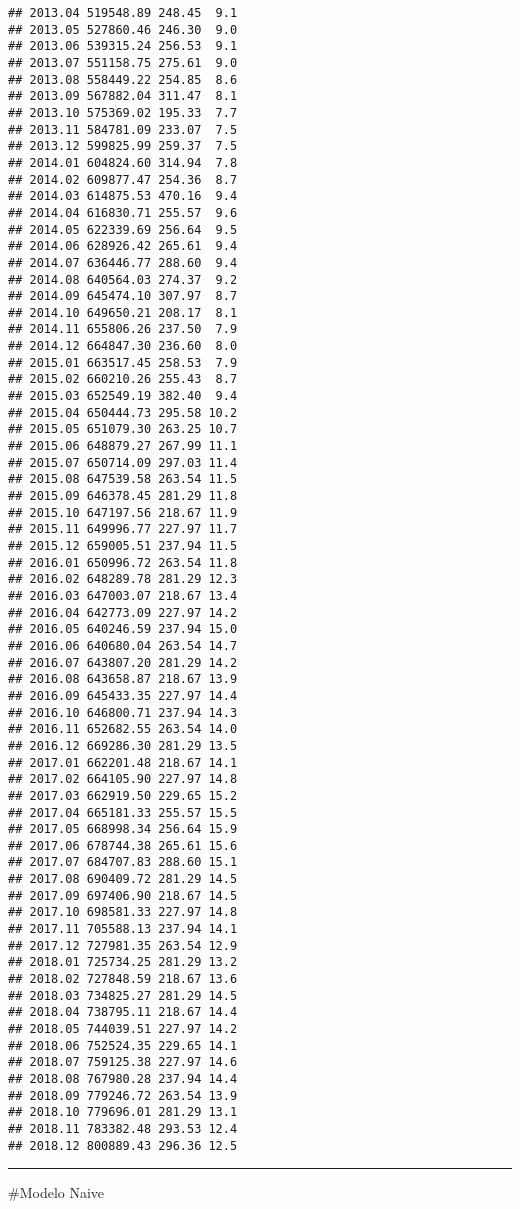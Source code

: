 \documentclass[]{article}
\begin{document}
\begin{verbatim}
## 2013.04 519548.89 248.45  9.1
## 2013.05 527860.46 246.30  9.0
## 2013.06 539315.24 256.53  9.1
## 2013.07 551158.75 275.61  9.0
## 2013.08 558449.22 254.85  8.6
## 2013.09 567882.04 311.47  8.1
## 2013.10 575369.02 195.33  7.7
## 2013.11 584781.09 233.07  7.5
## 2013.12 599825.99 259.37  7.5
## 2014.01 604824.60 314.94  7.8
## 2014.02 609877.47 254.36  8.7
## 2014.03 614875.53 470.16  9.4
## 2014.04 616830.71 255.57  9.6
## 2014.05 622339.69 256.64  9.5
## 2014.06 628926.42 265.61  9.4
## 2014.07 636446.77 288.60  9.4
## 2014.08 640564.03 274.37  9.2
## 2014.09 645474.10 307.97  8.7
## 2014.10 649650.21 208.17  8.1
## 2014.11 655806.26 237.50  7.9
## 2014.12 664847.30 236.60  8.0
## 2015.01 663517.45 258.53  7.9
## 2015.02 660210.26 255.43  8.7
## 2015.03 652549.19 382.40  9.4
## 2015.04 650444.73 295.58 10.2
## 2015.05 651079.30 263.25 10.7
## 2015.06 648879.27 267.99 11.1
## 2015.07 650714.09 297.03 11.4
## 2015.08 647539.58 263.54 11.5
## 2015.09 646378.45 281.29 11.8
## 2015.10 647197.56 218.67 11.9
## 2015.11 649996.77 227.97 11.7
## 2015.12 659005.51 237.94 11.5
## 2016.01 650996.72 263.54 11.8
## 2016.02 648289.78 281.29 12.3
## 2016.03 647003.07 218.67 13.4
## 2016.04 642773.09 227.97 14.2
## 2016.05 640246.59 237.94 15.0
## 2016.06 640680.04 263.54 14.7
## 2016.07 643807.20 281.29 14.2
## 2016.08 643658.87 218.67 13.9
## 2016.09 645433.35 227.97 14.4
## 2016.10 646800.71 237.94 14.3
## 2016.11 652682.55 263.54 14.0
## 2016.12 669286.30 281.29 13.5
## 2017.01 662201.48 218.67 14.1
## 2017.02 664105.90 227.97 14.8
## 2017.03 662919.50 229.65 15.2
## 2017.04 665181.33 255.57 15.5
## 2017.05 668998.34 256.64 15.9
## 2017.06 678744.38 265.61 15.6
## 2017.07 684707.83 288.60 15.1
## 2017.08 690409.72 281.29 14.5
## 2017.09 697406.90 218.67 14.5
## 2017.10 698581.33 227.97 14.8
## 2017.11 705588.13 237.94 14.1
## 2017.12 727981.35 263.54 12.9
## 2018.01 725734.25 281.29 13.2
## 2018.02 727848.59 218.67 13.6
## 2018.03 734825.27 281.29 14.5
## 2018.04 738795.11 218.67 14.4
## 2018.05 744039.51 227.97 14.2
## 2018.06 752524.35 229.65 14.1
## 2018.07 759125.38 227.97 14.6
## 2018.08 767980.28 237.94 14.4
## 2018.09 779246.72 263.54 13.9
## 2018.10 779696.01 281.29 13.1
## 2018.11 783382.48 293.53 12.4
## 2018.12 800889.43 296.36 12.5
\end{verbatim}

\begin{center}\rule{0.5\linewidth}{\linethickness}\end{center}

\#Modelo Naive
\end{document}
